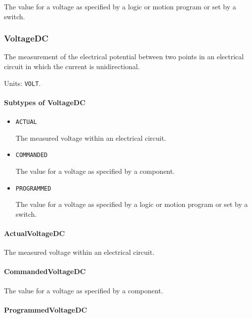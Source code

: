 The value for a voltage as specified by a logic or motion program or set by a switch.


\subsubsection{VoltageDC}
\label{sec:VoltageDC}



The measurement of the electrical potential between two points in an electrical circuit in which the current is unidirectional.


Units: \texttt{VOLT}.

\paragraph{Subtypes of VoltageDC}\mbox{}
\label{sec:Subtypes of VoltageDC}

\begin{itemize}

\item \texttt{ACTUAL}


The measured voltage within an electrical circuit.

\item \texttt{COMMANDED}


The value for a voltage as specified by a  component.

\item \texttt{PROGRAMMED}


The value for a voltage as specified by a logic or motion program or set by a switch.


\end{itemize}

\paragraph{ActualVoltageDC}\mbox{}
\label{sec:ActualVoltageDC}


The measured voltage within an electrical circuit.


\paragraph{CommandedVoltageDC}\mbox{}
\label{sec:CommandedVoltageDC}


The value for a voltage as specified by a  component.


\paragraph{ProgrammedVoltageDC}\mbox{}
\label{sec:ProgrammedVoltageDC}


